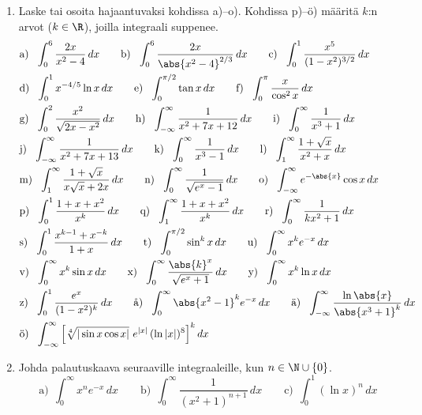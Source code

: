 \Harj
\begin{enumerate}

\item
Laske tai osoita hajaantuvaksi kohdissa a)--o). Kohdissa p)--ö) määritä $k$:n arvot ($k\in\R$),
joilla integraali suppenee.
\begingroup
\allowdisplaybreaks
\begin{align*}
&\text{a)}\ \ \int_0^6 \frac{2x}{x^2-4}\,dx \qquad
 \text{b)}\ \ \int_0^6 \frac{2x}{\abs{x^2-4}^{2/3}}\,dx \qquad
 \text{c)}\ \ \int_0^1 \frac{x^5}{(1-x^2)^{3/2}}\,dx \\
&\text{d)}\ \ \int_0^1 x^{-4/5}\ln x\,dx \qquad
 \text{e)}\ \ \int_0^{\pi/2} \tan x\,dx \qquad
 \text{f)}\ \ \int_0^\pi \frac{x}{\cos^2 x}\,dx \\
&\text{g)}\ \ \int_0^2 \frac{x^2}{\sqrt{2x-x^2}}\,dx \qquad
 \text{h)}\ \ \int_{-\infty}^\infty \frac{1}{x^2+7x+12}\,dx \qquad
 \text{i)}\ \ \int_0^\infty \frac{1}{x^3+1}\,dx \\
&\text{j)}\ \ \int_{-\infty}^\infty \frac{1}{x^2+7x+13}\,dx \qquad
 \text{k)}\ \ \int_0^\infty \frac{1}{x^3-1}\,dx \qquad
 \text{l)}\ \ \int_1^\infty \frac{1+\sqrt{x}}{x^2+x}\,dx \\
&\text{m)}\ \ \int_1^\infty \frac{1+\sqrt{x}}{x\sqrt{x}+2x}\,dx \qquad
 \text{n)}\ \ \int_0^\infty \frac{1}{\sqrt{e^x-1}}\,dx \qquad
 \text{o)}\ \ \int_{-\infty}^\infty e^{-\abs{x}}\cos x\,dx \\
&\text{p)}\ \ \int_0^1 \frac{1+x+x^2}{x^k}\,dx \qquad
 \text{q)}\ \ \int_1^\infty \frac{1+x+x^2}{x^k}\,dx \qquad
 \text{r)}\ \ \int_0^\infty \frac{1}{kx^2+1}\,dx \\
&\text{s)}\ \ \int_0^1 \frac{x^{k-1}+x^{-k}}{1+x}\,dx \qquad
 \text{t)}\ \ \int_0^{\pi/2} \sin^k x\,dx \qquad
 \text{u)}\ \ \int_0^\infty x^k e^{-x}\,dx \\
&\text{v)}\ \ \int_0^\infty x^k\sin x\,dx \qquad
 \text{x)}\ \ \int_0^\infty \frac{\abs{k}^x}{\sqrt{e^x+1}}\,dx \qquad
 \text{y)}\ \ \int_0^\infty x^k\ln x\,dx \\
&\text{z)}\ \ \int_0^1 \frac{e^x}{(1-x^2)^k}\,dx \qquad
 \text{å)}\ \ \int_0^\infty \abs{x^2-1}^k e^{-x}\,dx \qquad
 \text{ä)}\ \ \int_{-\infty}^\infty \frac{\ln\abs{x}}{\abs{x^3+1}^k}\,dx \\
&\text{ö)}\ \ \int_{-\infty}^\infty\left[\sqrt[4]{|\sin x\cos x|}\ e^{|x|}\,(\ln|x|)^8\right]^kdx
\end{align*}%
\endgroup

\item
Johda palautuskaava seuraaville integraaleille, kun $n\in\N\cup\{0\}$.
\[
\text{a)}\ \ \int_0^\infty x^n e^{-x}\,dx \qquad
\text{b)}\ \ \int_0^\infty \frac{1}{(x^2+1)^{n+1}}\,dx \qquad
\text{c)}\ \ \int_0^1 (\ln x)^n\,dx
\]


\end{enumerate}
